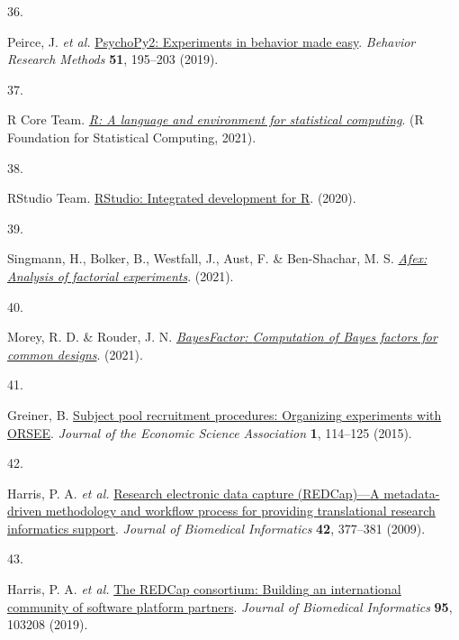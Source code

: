 \documentclass[
  man,floatsintext]{apa6}
\newlength{\cslhangindent}
\newlength{\csllabelwidth}
\newlength{\cslentryspacingunit} %
\newenvironment{CSLReferences}[2] %
 {%
  \setlength{\parindent}{0pt}
  \ifodd #1
  \let\oldpar\par
  \def\par{\hangindent=\cslhangindent\oldpar}
  \fi
  \setlength{\parskip}{#2\cslentryspacingunit}
 }%
 {}
\newcommand{\CSLLeftMargin}[1]{\parbox[t]{\csllabelwidth}{#1}}
\newcommand{\CSLRightInline}[1]{\parbox[t]{\linewidth - \csllabelwidth}{#1}\break}
\begin{document}
\begin{CSLReferences}{0}{0}
\leavevmode{}%
\CSLLeftMargin{36. }%
\CSLRightInline{Peirce, J. \emph{et al.} \href{https://doi.org/10.3758/s13428-018-01193-y}{{PsychoPy2}: {Experiments} in behavior made easy}. \emph{Behavior Research Methods} \textbf{51}, 195--203 (2019).}

\leavevmode{}%
\CSLLeftMargin{37. }%
\CSLRightInline{R Core Team. \emph{\href{https://www.R-project.org/}{R: A language and environment for statistical computing}}. (R Foundation for Statistical Computing, 2021).}

\leavevmode{}%
\CSLLeftMargin{38. }%
\CSLRightInline{RStudio Team. \href{http://www.rstudio.com}{{RStudio}: {Integrated} development for {R}}. (2020).}

\leavevmode{}%
\CSLLeftMargin{39. }%
\CSLRightInline{Singmann, H., Bolker, B., Westfall, J., Aust, F. \& Ben-Shachar, M. S. \emph{\href{https://CRAN.R-project.org/package=afex}{Afex: {A}nalysis of factorial experiments}}. (2021).}

\leavevmode{}%
\CSLLeftMargin{40. }%
\CSLRightInline{Morey, R. D. \& Rouder, J. N. \emph{\href{https://CRAN.R-project.org/package=BayesFactor}{{BayesFactor}: {Computation} of {Bayes} factors for common designs}}. (2021).}

\leavevmode{}%
\CSLLeftMargin{41. }%
\CSLRightInline{Greiner, B. \href{https://doi.org/10.1007/s40881-015-0004-4}{Subject pool recruitment procedures: {Organizing} experiments with {ORSEE}}. \emph{Journal of the Economic Science Association} \textbf{1}, 114--125 (2015).}

\leavevmode{}%
\CSLLeftMargin{42. }%
\CSLRightInline{Harris, P. A. \emph{et al.} \href{https://doi.org/10.1016/j.jbi.2008.08.010}{Research electronic data capture ({REDCap})---{A} metadata-driven methodology and workflow process for providing translational research informatics support}. \emph{Journal of Biomedical Informatics} \textbf{42}, 377--381 (2009).}

\leavevmode{}%
\CSLLeftMargin{43. }%
\CSLRightInline{Harris, P. A. \emph{et al.} \href{https://doi.org/10.1016/j.jbi.2019.103208}{The {REDCap} consortium: {Building} an international community of software platform partners}. \emph{Journal of Biomedical Informatics} \textbf{95}, 103208 (2019).}


\end{CSLReferences}
\end{document}

